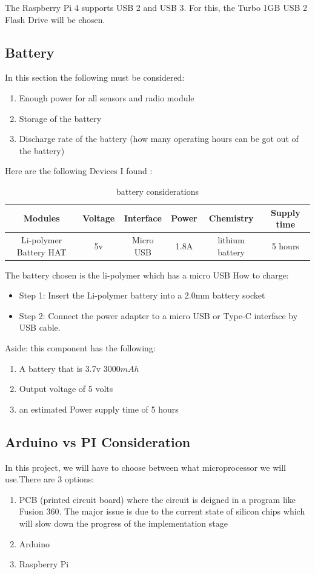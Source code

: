 The Raspberry Pi 4 supports USB 2 and  USB 3. For this, the Turbo 1GB USB 2 Flash Drive will  be chosen.

\subsection{Battery}
In this section the  following must be considered:
\begin{enumerate}
	\item Enough power for all  sensors  and  radio module
	\item Storage of the battery
	\item Discharge rate of the  battery (how many operating hours can be got out of the  battery)
\end{enumerate}
Here are the following  Devices I found :
\begin{table}[h!]
	\centering
	\begin{tabular}{|c|c|c|c|c|c|}
		\hline
		Modules & Voltage & Interface & Power & Chemistry & Supply time\\
		\hline
			Li-polymer Battery HAT  & 5v & Micro USB & 1.8A &lithium battery &5 hours \\ \hline
	\end{tabular}
	\caption{battery considerations}
	\label{battery considerations}
\end{table}

The battery chosen  is the li-polymer which has a micro USB 
How to charge:
\begin{itemize}
	\item Step 1: Insert the Li-polymer battery into a 2.0mm battery socket
	\item Step 2: Connect the power adapter to a micro USB or Type-C interface by USB cable.
\end{itemize}

Aside: this component has the following:
\begin{enumerate}
	\item A battery that is 3.7v 3000$mAh$ 
	\item Output voltage of 5 volts
	\item an estimated Power supply time  of  5 hours
\end{enumerate}
\subsection{Arduino vs PI Consideration }
In this project, we will have to choose between what microprocessor we will use.There are 3 options:
\begin{enumerate}
	\item PCB (printed circuit board)
	where the circuit is deigned in a program like Fusion 360. The major issue is due to  the current state of  silicon chips which will slow down  the progress of the implementation stage
	\item Arduino 
	\item Raspberry Pi
\end{enumerate}

